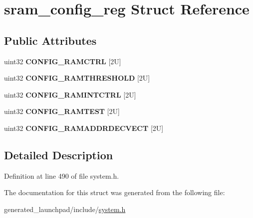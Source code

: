 \hypertarget{structsram__config__reg}{}\section{sram\+\_\+config\+\_\+reg Struct Reference}
\label{structsram__config__reg}
\subsection*{Public Attributes}
\begin{DoxyCompactItemize}
\item 
\mbox{\label{structsram__config__reg_ac6faa15604d9d8ac7da15f410c0e0f5f}} 
uint32 {\bfseries C\+O\+N\+F\+I\+G\+\_\+\+R\+A\+M\+C\+T\+RL} \mbox{[}2\+U\mbox{]}
\item 
\mbox{\label{structsram__config__reg_abdc48a061056e5477717b88781135c45}} 
uint32 {\bfseries C\+O\+N\+F\+I\+G\+\_\+\+R\+A\+M\+T\+H\+R\+E\+S\+H\+O\+LD} \mbox{[}2\+U\mbox{]}
\item 
\mbox{\label{structsram__config__reg_a2611c57e81e34f28e509f1ab8c3a0847}} 
uint32 {\bfseries C\+O\+N\+F\+I\+G\+\_\+\+R\+A\+M\+I\+N\+T\+C\+T\+RL} \mbox{[}2\+U\mbox{]}
\item 
\mbox{\label{structsram__config__reg_a543af38e7d50af7ba787b25a53d747a8}} 
uint32 {\bfseries C\+O\+N\+F\+I\+G\+\_\+\+R\+A\+M\+T\+E\+ST} \mbox{[}2\+U\mbox{]}
\item 
\mbox{\label{structsram__config__reg_a422b5b5cbfd882e797d24983e6c55b8e}} 
uint32 {\bfseries C\+O\+N\+F\+I\+G\+\_\+\+R\+A\+M\+A\+D\+D\+R\+D\+E\+C\+V\+E\+CT} \mbox{[}2\+U\mbox{]}
\end{DoxyCompactItemize}


\subsection{Detailed Description}


Definition at line 490 of file system.\+h.



The documentation for this struct was generated from the following file\+:\begin{DoxyCompactItemize}
\item 
generated\+\_\+launchpad/include/\mbox{\hyperlink{system_8h}{system.\+h}}\end{DoxyCompactItemize}
